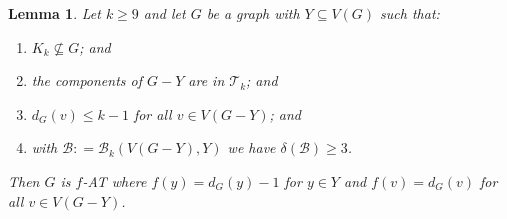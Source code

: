 \documentclass[12pt]{article}
\theoremstyle{plain}
\newtheorem{lem}[thm]{Lemma}
\theoremstyle{definition}
\theoremstyle{remark}
\newcommand{\fancy}[1]{\mathcal{#1}}
\newcommand{\T}{\fancy{T}}
\newcommand{\B}{\fancy{B}}
\newcommand{\DefinedAs}{\mathrel{\mathop:}=}
\begin{document}
\begin{lem}\label{MultipleHighConfigurationEuler}
Let $k \geq 9$ and let $G$ be a graph with $Y \subseteq V(G)$ such that:
\begin{enumerate}
\item $K_k \not \subseteq G$; and
\item the components of $G-Y$ are in $\T_k$; and
\item $d_G(v) \leq k - 1$ for all $v \in V(G-Y)$; and
\item with $\B \DefinedAs \B_k(V(G-Y), Y)$ we have $\delta(\B) \geq 3$.

\end{enumerate}

\noindent Then $G$ is $f$-AT where $f(y) = d_G(y) - 1$ for $y \in Y$ and $f(v) = d_G(v)$ for all $v \in V(G - Y)$.
\end{lem}
\end{document}
